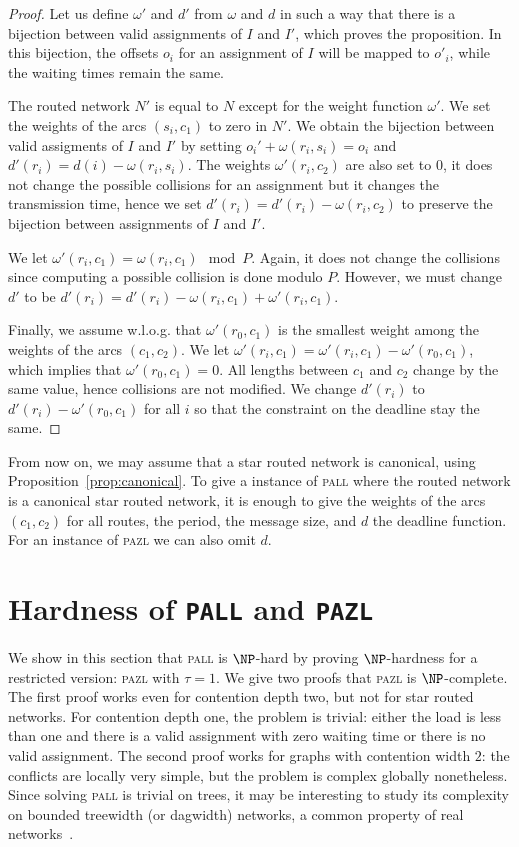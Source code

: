 \documentclass[a4paper,10pt]{article}
\newcommand\pazl{\textsc{pazl}\xspace}
\newcommand\pall{\textsc{pall}\xspace}
\begin{document}
  \begin{proof}
  Let us define $\omega'$ and $d'$ from $\omega$ and $d$ in such a way that there is a bijection 
   between valid assignments of $I$ and $I'$, which proves the proposition. In this bijection,
   the offsets $o_i$ for an assignment of $I$ will be mapped to $o'_i$, while the waiting times remain the same.
  
  The routed network $N'$ is equal to $N$ except for the weight function $\omega'$.
  We set the weights of the arcs $(s_i,c_1)$ to zero in $N'$. We obtain the bijection between valid assigments of $I$ and $I'$ by setting $o_i' + \omega(r_i,s_i) = o_i $ and $d'(r_i) = d(i) - \omega(r_i,s_i)$. The weights $\omega'(r_i,c_2)$ are also set to $0$, it does not change the possible collisions
  for an assignment but it changes the transmission time, hence we set $d'(r_i) = d'(r_i) - \omega(r_i,c_2)$
  to preserve the bijection between assignments of $I$ and $I'$. 

  We let $\omega'(r_i,c_1) = \omega(r_i,c_1) \mod P$. Again, it does not change the collisions since computing a possible collision is done modulo $P$. However, we must change $d'$ to be $d'(r_i) = d'(r_i) - \omega(r_i,c_1) + \omega'(r_i,c_1)$.

  Finally, we assume w.l.o.g. that $\omega'(r_0,c_1)$ is the smallest weight among the weights of the arcs
  $(c_1,c_2)$. We let $\omega'(r_i,c_1) = \omega'(r_i,c_1) - \omega'(r_0,c_1)$, which implies that $\omega'(r_0,c_1) = 0$.  All lengths between $c_1$ and $c_2$ change by the same value, hence collisions are not modified. We change $d'(r_i)$ to  $d'(r_i) - \omega'(r_0,c_1)$ for all $i$ so that the constraint on the deadline stay the same.
  \end{proof}

   From now on, we may assume that a star routed network is canonical, using Proposition~\ref{prop:canonical}. To give a instance of \pall where the routed network is a canonical star routed network, it is enough to give the weights of the arcs $(c_1,c_2)$ for all routes, the period, the message size, and $d$ the deadline function. For an instance of \pazl we can also omit $d$.


\section{Hardness of \texttt{PALL} and \texttt{PAZL}}
  \label{sec:complexity}


	We show in this section that \pall is $\NP$-hard by proving $\NP$-hardness for a restricted version: \pazl with $\tau = 1$. We give two proofs that \pazl is $\NP$-complete.
	The first proof works even for contention depth two, but not for star routed networks.
	 For contention depth one, the problem is trivial: either the load is less than one and there is a valid assignment with zero waiting time or there is no valid assignment. 
	 The second proof works for graphs with contention width $2$: the conflicts are locally very simple, but the problem is complex globally nonetheless. Since solving \pall is trivial on trees, it may be interesting to study its complexity on bounded treewidth (or dagwidth) networks, a common property of real networks~\cite{de2011treewidth}.
 
\end{document}
